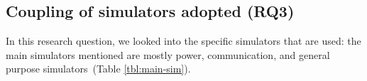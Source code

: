 \documentclass[1p]{elsarticle} %
\begin{document}










 

\subsection{Coupling of simulators adopted (RQ3)}

In this research question, we looked into the specific simulators that are used: the main simulators mentioned are mostly power, communication, and general purpose simulators~(Table \ref{tbl:main-sim}).
\end{document}
